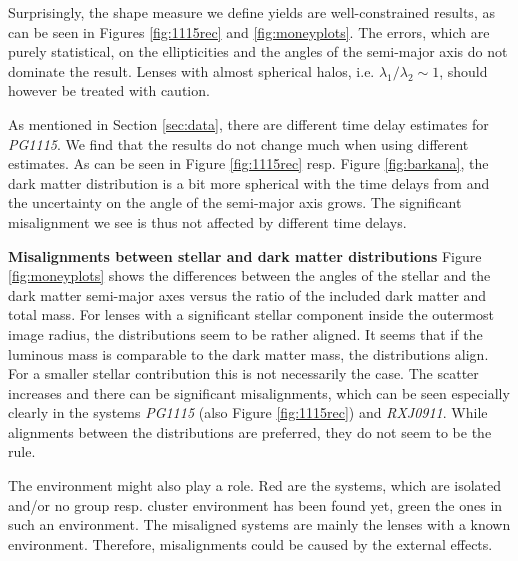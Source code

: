 \documentclass[useAMS,usenatbib]{mn2e}
\begin{document}
Surprisingly, the shape measure we define yields are well-constrained results, as can be seen in Figures \ref{fig:1115rec} and \ref{fig:moneyplots}. The errors, which are purely statistical, on the ellipticities and the angles of the semi-major axis do not dominate the result. Lenses with almost spherical halos, i.e. $\lambda_{1}/\lambda_{2}\sim1$, should however be treated with caution.

As mentioned in Section \ref{sec:data}, there are different time delay estimates for \textit{PG1115}. We find that the results do not change much when using different estimates. As can be seen in Figure \ref{fig:1115rec} resp. Figure \ref{fig:barkana}, the dark matter distribution is a bit more spherical with the time delays from \cite{2010MNRAS.406.2764T} and the uncertainty on the angle of the semi-major axis grows. The significant misalignment we see is thus not affected by different time delays.



\textbf{Misalignments between stellar and dark matter distributions}
Figure \ref{fig:moneyplots} shows the differences between the angles of the stellar and the dark matter semi-major axes versus the ratio of the included dark matter and total mass. For lenses with a significant stellar component inside the outermost image radius, the distributions seem to be rather aligned. It seems that if the luminous mass is comparable to the dark matter mass, the distributions align. For a smaller stellar contribution this is not necessarily the case. The scatter increases and there can be significant misalignments, which can be seen especially clearly in the systems \textit{PG1115} (also Figure \ref{fig:1115rec}) and \textit{RXJ0911}. While alignments between the distributions are preferred, they do not seem to be the rule.

The environment might also play a role. Red are the systems, which are isolated and/or no group resp. cluster environment has been found yet, green the ones in such an environment. The misaligned systems are mainly the lenses with a known environment. Therefore, misalignments could be caused by the external effects.
\end{document}
